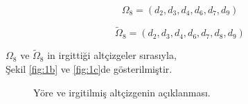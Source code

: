 \documentclass[11pt]{amsbook}
\begin{document}

\[
	\Omega_8 = (d_2, d_3, d_4, d_6, d_7, d_9)
\]

\[
	\tilde{\Omega}_8 = (d_2, d_3, d_4, d_6, d_7, d_8, d_9)
\]

$\Omega_8$ ve $\tilde{\Omega}_8$ in irgittiği altçizgeler sırasıyla, \\
Şekil \ref{fig:1b} ve \ref{fig:1c}de gösterilmiştir.

\begin{figure}[htbp]

\begin{center}



\caption{Yöre ve irgitilmiş altçizgenin açıklanması.}

\end{center}

\end{figure}
\end{document}
